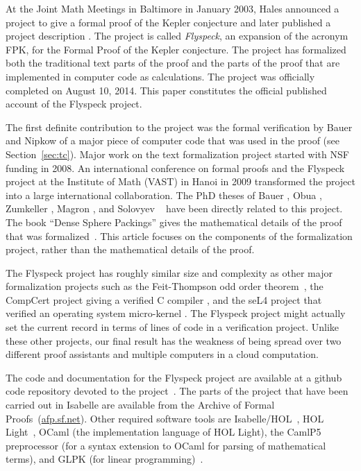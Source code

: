 At the Joint Math Meetings in Baltimore in January 2003, Hales announced a
project to give a formal proof of the Kepler conjecture and later
published a project description \cite{hales:DSP:2006:432}.
The project is called {\it Flyspeck}, an expansion of the acronym
FPK, for the Formal Proof of the Kepler conjecture.  The project has
formalized both the traditional text parts of the proof and the
parts of the proof that are implemented in computer code as
calculations.  The project was officially completed on August 10, 2014.
This paper constitutes the official published account
of the Flyspeck project.  

The first definite contribution to the project was the formal
verification by Bauer and Nipkow of a major piece of computer code
that was used in the proof (see Section~\ref{sec:tc}).  Major work on
the text formalization project started with NSF funding in 2008.  An
international conference on formal proofs and the Flyspeck project
at the Institute of Math (VAST) in Hanoi in 2009 transformed the project
into a large international collaboration.  The PhD theses of Bauer
\cite{Bauer:2006:Thesis}, Obua \cite{Obua:2005:Thesis}, Zumkeller
\cite{roland-thesis}, Magron \cite{Magron:3013:Thesis}, and
Solovyev ~\cite{Solovyev-thesis} have been directly related to this
project.  The book ``Dense Sphere Packings'' gives the mathematical
details of the proof that was formalized~\cite{DSP}.  This article
focuses on the components of the formalization project, rather than
the mathematical details of the proof.

The Flyspeck project has roughly similar size and complexity as other
major formalization projects such as the Feit-Thompson odd order
theorem~\cite{gonthier2013machine}, the CompCert project giving a
verified C compiler \cite{CC}, and the seL4 project that verified an
operating system micro-kernel \cite{Klein-SOSP09}.  The Flyspeck
project might actually set the current record in terms of lines of
code in a verification project.  Unlike these other projects, our
final result has the weakness of being spread over two different proof
assistants and multiple computers in a cloud computation.

The code and documentation for the Flyspeck project are available at a
github code repository devoted to the
project~\cite{website:FlyspeckProject}.  The parts of the project that
have been carried out in Isabelle are available from the Archive of
Formal Proofs~(\url{afp.sf.net}).  Other required software tools are
Isabelle/HOL~\cite{LNCS2283}, HOL Light~\cite{HOLL}, OCaml (the
implementation language of HOL Light), the CamlP5 preprocessor (for a
syntax extension to OCaml for parsing of mathematical terms), and GLPK
(for linear programming)~\cite{website:GLPK}.

